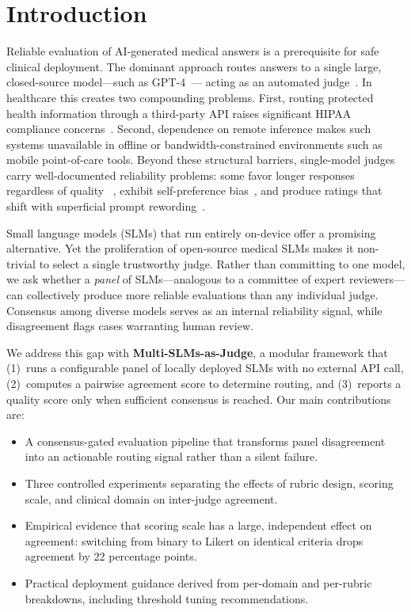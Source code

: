 \documentclass[conference]{IEEEtran}
\begin{document}
\section{Introduction}

Reliable evaluation of AI-generated medical answers is a prerequisite
for safe clinical deployment. The dominant approach routes answers to a
single large, closed-source model---such as GPT-4~\cite{achiam2023gpt}---
acting as an automated judge~\cite{zheng2023judging}. In healthcare this
creates two compounding problems. First, routing protected health
information through a third-party API raises significant HIPAA
compliance concerns~\cite{cohen2017hipaa}. Second, dependence on remote
inference makes such systems unavailable in offline or
bandwidth-constrained environments such as mobile point-of-care tools.
Beyond these structural barriers, single-model judges carry well-documented
reliability problems: some favor longer responses regardless of quality
~\cite{wang2023verbosity}, exhibit self-preference bias~\cite{panickssery2024bias},
and produce ratings that shift with superficial prompt rewording~\cite{zeng2023framing}.

Small language models (SLMs) that run entirely on-device offer a promising
alternative. Yet the proliferation of open-source medical SLMs makes it
non-trivial to select a single trustworthy judge. Rather than committing
to one model, we ask whether a \emph{panel} of SLMs---analogous to a
committee of expert reviewers---can collectively produce more reliable
evaluations than any individual judge. Consensus among diverse models
serves as an internal reliability signal, while disagreement flags
cases warranting human review.

We address this gap with \textbf{Multi-SLMs-as-Judge}, a modular framework
that (1)~runs a configurable panel of locally deployed SLMs with no
external API call, (2)~computes a pairwise agreement score to determine
routing, and (3)~reports a quality score only when sufficient consensus
is reached. Our main contributions are:
\begin{itemize}
  \item A consensus-gated evaluation pipeline that transforms panel
        disagreement into an actionable routing signal rather than a
        silent failure.
  \item Three controlled experiments separating the effects of rubric
        design, scoring scale, and clinical domain on inter-judge agreement.
  \item Empirical evidence that scoring scale has a large, independent
        effect on agreement: switching from binary to Likert on identical
        criteria drops agreement by 22 percentage points.
  \item Practical deployment guidance derived from per-domain and
        per-rubric breakdowns, including threshold tuning recommendations.
\end{itemize}
\end{document}
